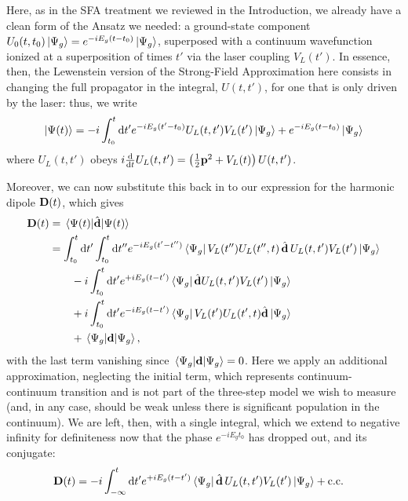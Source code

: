 Here, as in the SFA treatment we reviewed in the Introduction, we already have a clean form of the Ansatz we needed: a ground-state component $U_0(t,t_0) \ket{\Psi_g} = e^{-iE_g(t-t_0)}\ket{\Psi_g}$, superposed with a continuum wavefunction ionized at a superposition of times $t'$ via the laser coupling $V_L(t')$. In essence, then, the Lewenstein version of the Strong-Field Approximation here consists in changing the full propagator in the integral, $U(t,t')$, for one that is only driven by the laser: thus, we write
\begin{equation}
\ket{\Psi(t)}
=
-i\int_{t_0}^{t} \mathrm{d} t'
e^{-iE_g(t'-t_0)}
U_L(t,t')
V_L(t')
\ket{\Psi_g}
+
e^{-iE_g(t-t_0)}\ket{\Psi_g}
\label{e7-hhg-dyson-expansion-sfa}
\end{equation}
where $U_L(t,t')$ obeys $i\tfrac{\mathrm{d}}{\mathrm{d} t}U_L(t,t')= \left(\tfrac12 \vb{p}^2 + V_L(t)\right)U(t,t')$.

Moreover, we can now substitute this back in to our expression for the harmonic dipole $\vb{D}(t)$, which gives
\begin{align}
\vbD(t)
& = \matrixel{\Psi(t)}{\hat{\vbd}}{\Psi(t)}
\nonumber \\ & =
\int_{t_0}^{t} \d t'
\int_{t_0}^{t} \d t''
e^{-iE_g(t'-t'')}
\bra{\Psi_g}
V_L(t'')
U_L(t'',t)
\,\hat{\vbd}\,
U_L(t,t')
V_L(t')
\ket{\Psi_g}
\nonumber \\ & \qquad
-i\int_{t_0}^{t} \d t'
e^{+iE_g(t-t')}
\bra{\Psi_g}
\hat{\vbd}
U_L(t,t')
V_L(t')
\ket{\Psi_g}
\nonumber \\ & \qquad
+i\int_{t_0}^{t} \d t'
e^{-iE_g(t-t')}
\bra{\Psi_g}
V_L(t')
U_L(t',t)
\hat{\vbd}
\ket{\Psi_g}
\nonumber \\ & \qquad
+\matrixel{\Psi_g}{\vbd}{\Psi_g}
,
\end{align}
with the last term vanishing since $\matrixel{\Psi_g}{\vbd}{\Psi_g}=0$. Here we apply an additional approximation, neglecting the initial term, which represents continuum-continuum transition and is not part of the three-step model we wish to measure (and, in any case, should be weak unless there is significant population in the continuum). We are left, then, with a single integral, which we extend to negative infinity for definiteness now that the phase $e^{-iE_gt_0}$ has dropped out, and its conjugate:
\begin{align}
\vb{D}(t)
& = 
-i\int_{-\infty}^{t} \mathrm{d} t'
e^{+iE_g(t-t')}
\bra{\Psi_g}
\hat{\vb{d}}\,
U_L(t,t')
V_L(t')
\ket{\Psi_g}
+\mathrm{c.c.}
\label{e7-harmonic-dipole-symbolic}
\end{align}

